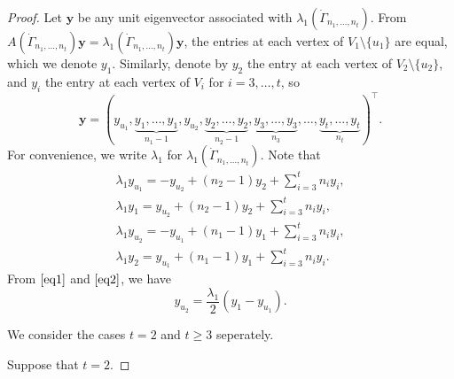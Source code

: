 \documentclass[12pt]{article}
\numberwithin{equation}{section}
\begin{document}
\begin{proof}
Let $\mathbf{y}$ be any unit eigenvector associated with $\lambda_1(\dot\Gamma_{n_1, \dots, n_t})$.  
From $A(\dot\Gamma_{n_1, \dots, n_t})\mathbf{y}=\lambda_1(\dot\Gamma_{n_1, \dots, n_t})\mathbf{y}$, 
the entries at each vertex of $V_1\setminus \{u_1\}$ are equal, which we denote $y_1$. Similarly, denote by $y_2$ the entry at each vertex of $V_2\setminus \{u_2\}$, and  $y_i$ the entry at each vertex of $V_i$ for $i=3,\dots, t$, so 
\[
\mathbf{y}=(y_{u_1}, \underbrace{y_1,\dots,y_1}_{n_1-1}, y_{u_2}, \underbrace{y_2,\dots,y_2}_{n_2-1}, \underbrace{y_3,\dots,y_3}_{n_3}, \dots, \underbrace{y_t,\dots,y_t}_{n_t})^\top.
\]
For convenience, we write $\lambda_1$ for $\lambda_1(\dot\Gamma_{n_1, \dots, n_t})$.
Note that
\begin{align}
\lambda_1 y_{u_1}=-y_{u_2}+(n_2-1)y_2+\sum_{i=3}^tn_iy_i, \label{eq1}\\
\lambda_1 y_1=y_{u_2}+(n_2-1)y_2+\sum_{i=3}^tn_iy_i, \label{eq2}\\
\lambda_1 y_{u_2}=-y_{u_1}+(n_1-1)y_1+\sum_{i=3}^tn_iy_i, \label{eq3}\\
\lambda_1 y_2=y_{u_1}+(n_1-1)y_1+\sum_{i=3}^tn_iy_i. \label{eq4}
\end{align}
From $\eqref{eq1}$ and $\eqref{eq2}$, we have
\begin{equation}\label{v0}
y_{u_2}=\frac{\lambda_1}{2}(y_1-y_{u_1}).
\end{equation} 

We consider the cases $t=2$ and $t\ge 3$ seperately. 

Suppose  that $t=2$. 


\end{proof}
\end{document}
